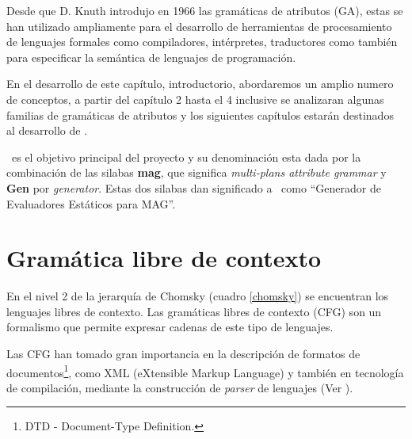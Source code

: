 Desde que D. Knuth introdujo en 1966 las gramáticas de atributos (GA), estas se han utilizado ampliamente para el desarrollo de herramientas de procesamiento de lenguajes formales como compiladores, intérpretes, traductores como también para especificar la semántica de lenguajes de programación.

En el desarrollo de este capítulo, introductorio, abordaremos un amplio numero de conceptos, a partir del capítulo 2 hasta el 4 inclusive se analizaran algunas familias de gramáticas de atributos y los siguientes capítulos estarán destinados al desarrollo de \maggen. 

\maggen\ es el objetivo principal del proyecto y su denominación esta dada por la combinación de las silabas \textbf{mag}, que significa \textit{multi-plans attribute grammar} y \textbf{Gen} por \textit{generator}. Estas dos silabas dan significado a \maggen\ como ``Generador de Evaluadores Estáticos para MAG''.

\section{Gramática libre de contexto}
\label{sec:def-CFG}
En el nivel 2 de la jerarquía de Chomsky (cuadro \ref{chomsky}) se encuentran los lenguajes libres de contexto. Las gramáticas libres de contexto (CFG) son un formalismo que permite expresar cadenas de este tipo de lenguajes.

Las CFG han tomado gran importancia en la descripción de formatos de documentos\footnote{DTD - Document-Type Definition.}, como XML (eXtensible Markup Language) y también en tecnología de compilación, mediante la construcción de \textit{parser} de lenguajes (Ver \cite{compiladores}).  

